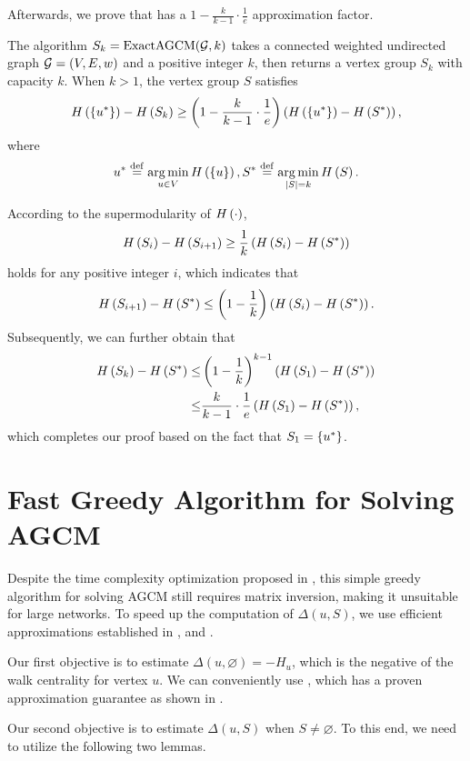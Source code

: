 \documentclass[10pt,twocolumn,twoside]{IEEEtran}
\begin{document}
Afterwards, we prove that  has a \(1-\frac{k}{k-1}\cdot\frac{1}{e}\) approximation factor.
\begin{theorem}
    The algorithm \(S_k=\text{ExactAGCM}(\mathcal{G},k)\) takes a connected weighted undirected graph \(\mathcal{G}=(V,E,w)\) and a positive integer \(k\), then returns a vertex group \(S_k\) with capacity \(k\).
    When \(k>1\), the vertex group \(S\) satisfies
    \[H\left(\left\{u^* \right\}\right)-H\left(S_k\right)\ge\left( 1-\frac{k}{k-1}\cdot\frac{1}{e} \right)\left( H\left(\left\{u^* \right\}\right)-H\left(S^*\right) \right),\]
    where
    \[u^*\stackrel{\mathrm{def}}{=}\operatorname*{arg\,min}_{u\in V}H\left(\left\{u \right\}\right),S^*\stackrel{\mathrm{def}}{=}\operatorname*{arg\,min}_{\left|S \right|=k}H\left(S\right).\]
\end{theorem}
\begin{IEEEproof}
    According to the supermodularity of \(H\left(\cdot\right)\),
    \[H\left(S_i\right)-H\left(S_{i+1}\right)\ge\frac{1}{k}\left( H\left(S_i\right)-H\left(S^*\right) \right)\]
    holds for any positive integer \(i\), which indicates that
    \[H\left(S_{i+1}\right)-H\left(S^*\right)\le\left( 1-\frac{1}{k} \right)\left( H\left(S_i\right)-H\left(S^*\right) \right).\]
    Subsequently, we can further obtain that
    \begin{align*}
        H\left(S_k\right)-H\left(S^*\right)\le & \left( 1-\frac{1}{k} \right)^{k-1}\left( H\left(S_1\right)-H\left(S^*\right) \right)    \\
        \le                      & \frac{k}{k-1}\cdot\frac{1}{e}\left( H\left(S_1\right)-H\left(S^*\right) \right),
    \end{align*}
    which completes our proof based on the fact that \(S_1=\left\{u^* \right\}\).
\end{IEEEproof}

\section{Fast Greedy Algorithm for Solving AGCM}\label{sec:approx-algo2}

Despite the time complexity optimization proposed in , this simple greedy algorithm for solving AGCM still requires matrix inversion, making it unsuitable for large networks.
To speed up the computation of \(\Delta(u,S)\), we use efficient approximations established in ,  and .

Our first objective is to estimate \(\Delta(u,\varnothing)=-H_u\), which is the negative of the walk centrality for vertex \(u\).
We can conveniently use , which has a proven approximation guarantee as shown in .

Our second objective is to estimate \(\Delta(u,S)\) when \(S\neq\varnothing\).
To this end, we need to utilize the following two lemmas.
\end{document}
